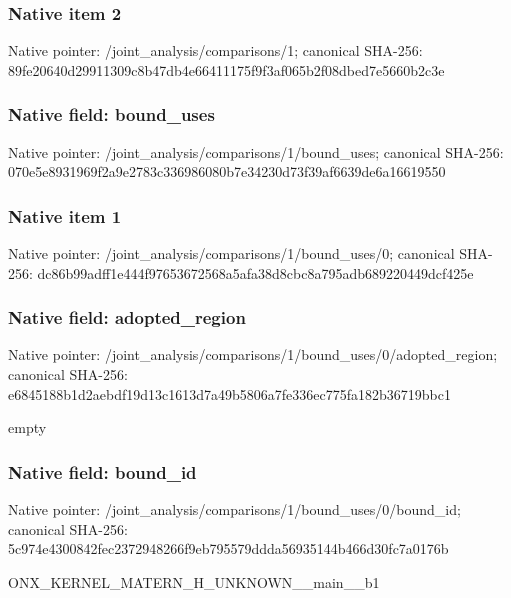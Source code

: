 \documentclass[10pt,a4paper]{article}
\begin{document}
\subsubsection{Native item 2}
Native pointer: /joint\_\allowbreak{}analysis/comparisons/1; canonical SHA-256: 89fe20640d29911309c8b47db4e66411175f9f3af065b2f08dbed7e5660b2c3e

\subsubsection{Native field: bound\_\allowbreak{}uses}
Native pointer: /joint\_\allowbreak{}analysis/comparisons/1/bound\_\allowbreak{}uses; canonical SHA-256: 070e5e8931969f2a9e2783c336986080b7e34230d73f39af6639de6a16619550

\subsubsection{Native item 1}
Native pointer: /joint\_\allowbreak{}analysis/comparisons/1/bound\_\allowbreak{}uses/0; canonical SHA-256: dc86b99adff1e444f97653672568a5afa38d8cbc8a795adb689220449dcf425e

\subsubsection{Native field: adopted\_\allowbreak{}region}
Native pointer: /joint\_\allowbreak{}analysis/comparisons/1/bound\_\allowbreak{}uses/0/adopted\_\allowbreak{}region; canonical SHA-256: e6845188b1d2aebdf19d13c1613d7a49b5806a7fe336ec775fa182b36719bbc1

\begingroup\raggedright\sloppy empty\par\endgroup

\subsubsection{Native field: bound\_\allowbreak{}id}
Native pointer: /joint\_\allowbreak{}analysis/comparisons/1/bound\_\allowbreak{}uses/0/bound\_\allowbreak{}id; canonical SHA-256: 5c974e4300842fec2372948266f9eb795579ddda56935144b466d30fc7a0176b

\begingroup\raggedright\sloppy ONX\_\allowbreak{}KERNEL\_\allowbreak{}MATERN\_\allowbreak{}H\_\allowbreak{}UNKNOWN\_\allowbreak{}\_\allowbreak{}main\_\allowbreak{}\_\allowbreak{}b1\par\endgroup
\end{document}
